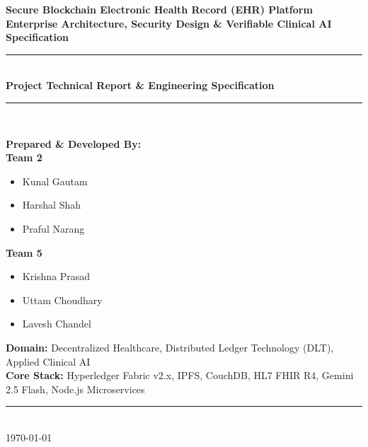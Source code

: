 \documentclass[11pt,a4paper]{article}
\begin{document}
\begin{titlepage}
    \centering
    \vspace*{1.0cm}
    
    {\Huge \textbf{\color{primaryblue}Secure Blockchain Electronic Health Record (EHR) Platform}}\\[0.5cm]
    {\LARGE \textbf{Enterprise Architecture, Security Design \& Verifiable Clinical AI Specification}}\\[1.2cm]
    
    \rule{\linewidth}{1.2pt}\\[0.4cm]
    {\large \textbf{Project Technical Report \& Engineering Specification}}\\[0.2cm]
    \rule{\linewidth}{1.2pt}\\[1.2cm]
    
    \begin{minipage}[t]{0.45\textwidth}
        \textbf{\large Prepared \& Developed By:}\\[0.3cm]
        \textbf{\large Team 2}
        \begin{itemize}
            \item Kunal Gautam
            \item Harshal Shah
            \item Praful Narang
        \end{itemize}
    \end{minipage}
    \hfill
    \begin{minipage}[t]{0.45\textwidth}
        \vspace*{0.75cm}
        \textbf{\large Team 5}
        \begin{itemize}
            \item Krishna Prasad
            \item Uttam Choudhary
            \item Lavesh Chandel
        \end{itemize}
    \end{minipage}
    
    \vfill
    
    \begin{minipage}{0.95\textwidth}
        \centering
        \textbf{Domain:} Decentralized Healthcare, Distributed Ledger Technology (DLT), Applied Clinical AI\\
        \textbf{Core Stack:} Hyperledger Fabric v2.x, IPFS, CouchDB, HL7 FHIR R4, Gemini 2.5 Flash, Node.js Microservices\\[0.4cm]
        \rule{0.6\linewidth}{0.5pt}\\[0.3cm]
        \small \today
    \end{minipage}
\end{titlepage}
\end{document}
